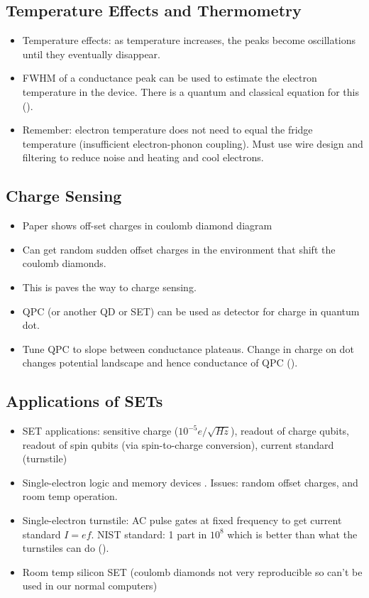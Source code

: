 \subsection{Temperature Effects and Thermometry}

\begin{itemize}
    \item Temperature effects: as temperature increases, the peaks become oscillations until they eventually disappear.
    \item FWHM of a conductance peak can be used to estimate the electron temperature in the device. There is a quantum and classical equation for this ().
    \item Remember: electron temperature does not need to equal the fridge temperature (insufficient electron-phonon coupling). Must use wire design and filtering to reduce noise and heating and cool electrons.
\end{itemize}

\subsection{Charge Sensing}

\begin{itemize}
    \item Paper shows off-set charges in coulomb diamond diagram \parencite{Bolotin2004}
    \item Can get random sudden offset charges in the environment that shift the coulomb diamonds.
    \item This is paves the way to charge sensing.
    \item QPC (or another QD or SET) can be used as detector for charge in quantum dot.
    \item Tune QPC to slope between conductance plateaus. Change in charge on dot changes potential landscape and hence conductance of QPC ().
\end{itemize}

\subsection{Applications of SETs}

\begin{itemize}
    \item SET applications: sensitive charge ($10^{-5} e/\sqrt{Hz}$), readout of charge qubits, readout of spin qubits (via spin-to-charge conversion), current standard (turnstile)
    \item Single-electron logic and memory devices \parencite{Korotkov1999}. Issues: random offset charges, and room temp operation.
    \item Single-electron turnstile: AC pulse gates at fixed frequency to get current standard $I = ef$. NIST standard: 1 part in $10^8$ which is better than what the turnstiles can do ().
    \item Room temp silicon SET (coulomb diamonds not very reproducible so can't be used in our normal computers) \parencite{Zhang1998}
\end{itemize}

